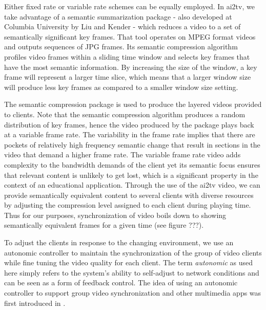 \documentclass{sig-alternate}
\begin{document}
Either fixed rate or variable rate schemes can be equally employed. In
ai2tv, we take advantage of a semantic summarization package - also
developed at Columbia University by Liu and Kender \cite{TIECHENG} -
which reduces a video to a set of semantically significant key frames.
That tool operates on MPEG format videos and outputs sequences of JPG
frames.  Its semantic compression algorithm profiles video frames
within a sliding time window and selects key frames that have the most
semantic information.  By increasing the size of the window, a key
frame will represent a larger time slice, which means that a larger
window size will produce less key frames as compared to a smaller
window size setting.  

The semantic compression package is used to produce the layered videos
provided to clients.  Note that the semantic compression algorithm
produces a random distribution of key frames, hence the video produced
by the package plays back at a variable frame rate.  The variability
in the frame rate implies that there are pockets of relatively high
frequency semantic change that result in sections in the video that
demand a higher frame rate.  The variable frame rate video adds
complexity to the bandwidth demands of the client yet its semantic
focus ensures that relevant content is unlikely to get lost, which is
a significant property in the context of an educational application.
Through the use of the ai2tv video, we can provide semantically
equivalent content to several clients with diverse resources by
adjusting the compression level assigned to each client during playing
time.  Thus for our purposes, synchronization of video boils down to
showing semantically equivalent frames for a given time (see figure
???).

To adjust the clients in response to the changing environment, we use
an autonomic controller to maintain the synchronization of the group
of video clients while fine tuning the video quality for each client.
The term \textit{autonomic} as used here simply refers to the system's
ability to self-adjust to network conditions and can be seen as a form
of feedback control.  The idea of using an autonomic controller to
support group video synchronization and other multimedia apps was
first introduced in \cite{EWSPT}.
\end{document}
